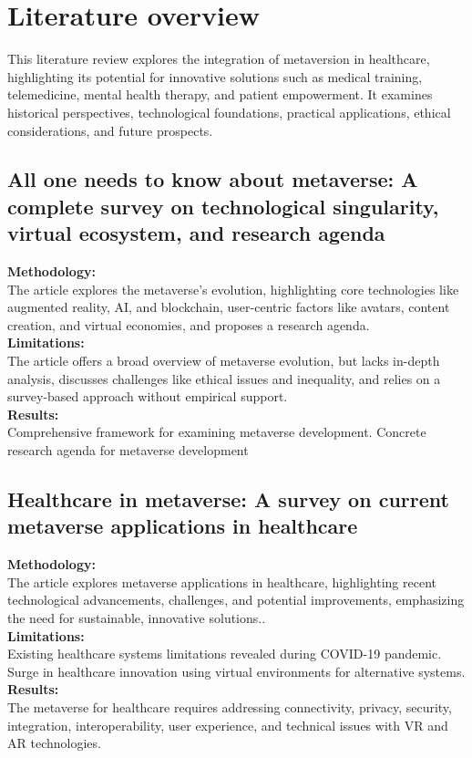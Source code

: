 \chapter{Literature overview}
\label{ch:lit-review}
This literature review explores the integration of metaversion in healthcare, highlighting its potential for innovative solutions such as medical training, telemedicine, mental health therapy, and patient empowerment. It examines historical perspectives, technological foundations, practical applications, ethical considerations, and future prospects.
\section{All one needs to know about metaverse: A complete survey on technological singularity, virtual ecosystem, and research agenda 
	\cite{lee2021all}\cite{BookChapter1}}
\textbf{Methodology:}\\The article explores the metaverse's evolution, highlighting core technologies like augmented reality, AI, and blockchain, user-centric factors like avatars, content creation, and virtual economies, and proposes a research agenda. \\
\textbf{Limitations:}\\The article offers a broad overview of metaverse evolution, but lacks in-depth analysis, discusses challenges like ethical issues and inequality, and relies on a survey-based approach without empirical support. \\
\textbf{Results:}\\Comprehensive framework for examining metaverse development.
Concrete research agenda for metaverse development
\section{Healthcare in metaverse: A survey on current metaverse applications in healthcare
	\cite{bansal2022healthcare}\cite{JournalArticle12}}
\textbf{Methodology:}\\
The article explores metaverse applications in healthcare, highlighting recent technological advancements, challenges, and potential improvements, emphasizing the need for sustainable, innovative solutions..\\
\textbf{Limitations:}\\Existing healthcare systems limitations revealed during COVID-19 pandemic. Surge in healthcare innovation using virtual environments for alternative systems. \\
\textbf{Results:}\\The metaverse for healthcare requires addressing connectivity, privacy, security, integration, interoperability, user experience, and technical issues with VR and AR technologies.
